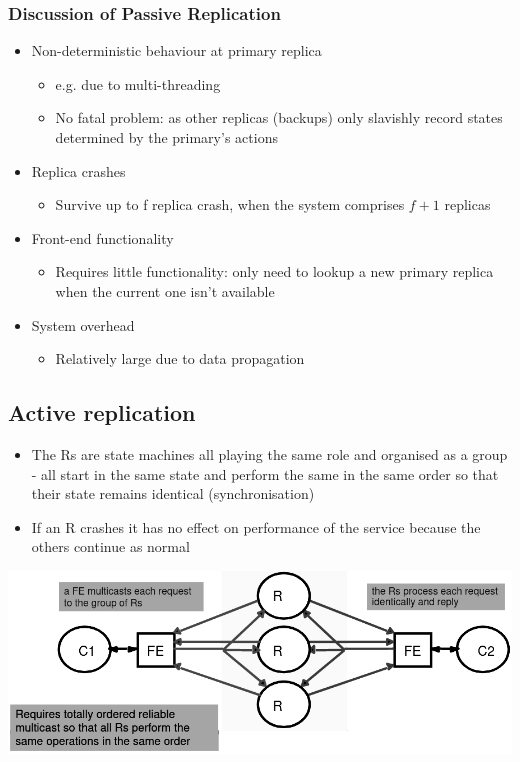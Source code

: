 \documentclass{article}[18pt]
\begin{document}
\subsubsection{Discussion of Passive Replication}
\begin{itemize}
	\item Non-deterministic behaviour at primary replica
	\begin{itemize}
		\item e.g. due to multi-threading
		\item No fatal problem: as other replicas (backups) only slavishly record states determined by the primary's actions
	\end{itemize}
	\item Replica crashes
	\begin{itemize}
		\item Survive up to f replica crash, when the system comprises $f+1$ replicas
	\end{itemize}
	\item Front-end functionality
	\begin{itemize}
		\item Requires little functionality: only need to lookup a new primary replica when the current one isn't available
	\end{itemize}
	\item System overhead
	\begin{itemize}
		\item Relatively large due to data propagation
	\end{itemize}
\end{itemize}
\subsection{Active replication}
\begin{itemize}
	\item The Rs are state machines all playing the same role and organised as a group - all start in the same state and perform the same in the same order so that their state remains identical (synchronisation)
	\item If an R crashes it has no effect on performance of the service because the others continue as normal
\end{itemize}
\begin{center}
	\includegraphics[scale=0.7]{"Active Replication"}
\end{center}
\end{document}
